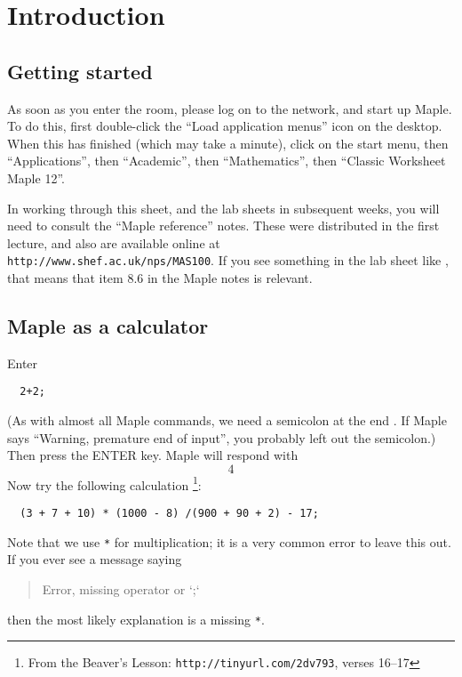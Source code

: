 \documentclass[a4paper,10pt]{amsbook}
\numberwithin{example}{chapter}
\begin{document}
\chapter{Introduction}

\section{Getting started}

As soon as you enter the room, please log on to the network,
and start up Maple.  To do this, first double-click the ``Load
application menus'' icon on the desktop.  When this has
finished (which may take a minute), click on the start menu,
then ``Applications'', then ``Academic'', then
``Mathematics'', then ``Classic Worksheet Maple 12''.

In working through this sheet, and the lab sheets in
subsequent weeks, you will need to consult the ``Maple
reference'' notes.  These were distributed in the first
lecture, and also are available online at\\
\verb~http://www.shef.ac.uk/nps/MAS100~.  
If you see something in the lab sheet like ,
that means that item 8.6 in the Maple notes is relevant.

\section{Maple as a calculator}

\begin{exercise}\label{ex-twoplustwo}
 Enter
\begin{verbatim}
  2+2;
\end{verbatim}
 (As with almost all Maple commands, we need a semicolon at
 the end \note{\NOTEsemi}.  If Maple says ``Warning,
 premature end of input'', you probably left out the
 semicolon.)  Then press the ENTER key.  Maple will respond
 with
 \[ 4 \]
 Now try the following calculation%
 \footnote{From the Beaver's Lesson:
 \verb~http://tinyurl.com/2dv793~,
 verses 16--17}:
\begin{verbatim}
  (3 + 7 + 10) * (1000 - 8) /(900 + 90 + 2) - 17;
\end{verbatim}
 Note that we use \verb~*~ for
 multiplication\note{\NOTEstar}; it is a very common error to 
 leave this out.  If you ever see a message saying
 \begin{quotation}
  Error, missing operator or `;` 
 \end{quotation}
 then the most likely explanation is a missing \verb~*~.  
\end{exercise}
\end{document}
